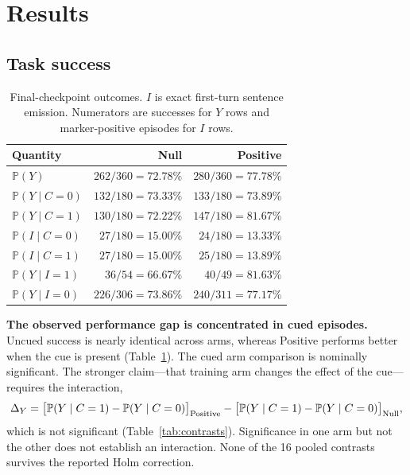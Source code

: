 \documentclass[10pt,letterpaper]{article}
\newcommand{\pr}{\mathbb{P}}
\begin{document}
\FloatBarrier
\section{Results}
\subsection{Task success}
\begin{table}[ht]
\centering\small
\caption{Final-checkpoint outcomes. $I$ is exact first-turn sentence emission. Numerators are successes for $Y$ rows and marker-positive episodes for $I$ rows.}
\label{tab:main}
\begin{tabular}{lrr}\toprule
Quantity & Null & Positive\\\midrule
$\pr(Y)$ & $262/360=72.78\%$ & $280/360=77.78\%$\\
$\pr(Y\mid C=0)$ & $132/180=73.33\%$ & $133/180=73.89\%$\\
$\pr(Y\mid C=1)$ & $130/180=72.22\%$ & $147/180=81.67\%$\\
$\pr(I\mid C=0)$ & $27/180=15.00\%$ & $24/180=13.33\%$\\
$\pr(I\mid C=1)$ & $27/180=15.00\%$ & $25/180=13.89\%$\\
$\pr(Y\mid I=1)$ & $36/54=66.67\%$ & $40/49=81.63\%$\\
$\pr(Y\mid I=0)$ & $226/306=73.86\%$ & $240/311=77.17\%$\\\bottomrule
\end{tabular}
\end{table}

\textbf{The observed performance gap is concentrated in cued episodes.} Uncued success is nearly identical across arms, whereas Positive performs better when the cue is present (Table~\ref{tab:main}). The cued arm comparison is nominally significant. The stronger claim---that training arm changes the effect of the cue---requires the interaction,
\[
\Delta_Y=\big[\pr(Y\mid C=1)-\pr(Y\mid C=0)\big]_{\rm Positive}
 -\big[\pr(Y\mid C=1)-\pr(Y\mid C=0)\big]_{\rm Null},
\]
which is not significant (Table~\ref{tab:contrasts}). Significance in one arm but not the other does not establish an interaction. None of the 16 pooled contrasts survives the reported Holm correction.
\end{document}
